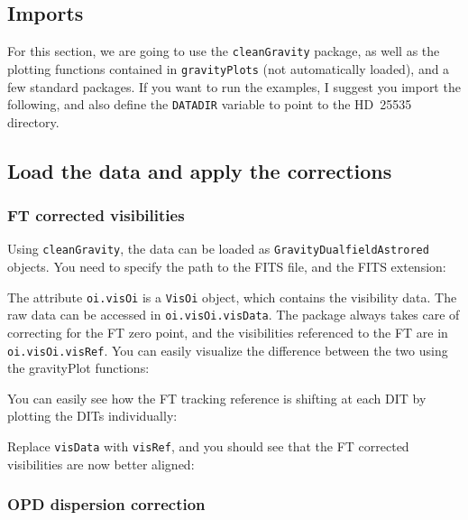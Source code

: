 \subsection{Imports}

For this section, we are going to use the \verb|cleanGravity| package, as well as the plotting functions contained in \verb|gravityPlots| (not automatically loaded), and a few standard packages.
If you want to run the examples, I suggest you import the following, and also define the \verb|DATADIR| variable to point to the HD~25535 directory.



\subsection{Load the data and apply the corrections}

\subsubsection{FT corrected visibilities}

Using \verb|cleanGravity|, the data can be loaded as \verb|GravityDualfieldAstrored| objects. You need to specify the path to the FITS file, and the FITS extension:


The attribute \verb|oi.visOi| is a \verb|VisOi| object, which contains the visibility data. The raw data can be accessed in \verb|oi.visOi.visData|. The package always takes care of correcting for the FT zero point, and the visibilities referenced to the FT are in \verb|oi.visOi.visRef|. You can easily visualize the difference between the two using the gravityPlot functions:


You can easily see how the FT tracking reference is shifting at each DIT by plotting the DITs individually:


\noindent{}Replace \verb|visData| with \verb|visRef|, and you should see that the FT corrected visibilities are now better aligned:



\subsubsection{OPD dispersion correction}

